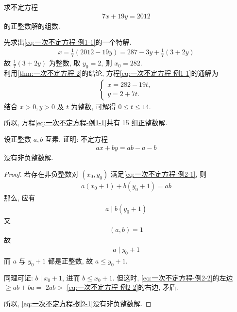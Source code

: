 \begin{example}
	求不定方程
	\begin{align}\label{eq:一次不定方程-例1-1}
		7 x+19 y=2012
	\end{align}
	的正整数解的组数.
\end{example}
\begin{solution}
	先求出\autoref{eq:一次不定方程-例1-1}的一个特解.
	\begin{align*}
		x=\frac{1}{7}(2012-19 y)=287-3 y+\frac{1}{7}(3+2 y)
	\end{align*}
	故 $\frac{1}{7}(3+2 y)$ 为整数, 取 $y_{0}=2$, 则 $x_{0}=282$.\\
	利用\autoref{thm:一次不定方程-2}的结论, 方程\autoref{eq:一次不定方程-例1-1}的通解为
	\begin{align*}
		\left\{\begin{array}{l}
			       x=282-19 t, \\
			       y=2+7 t .
		       \end{array}\right.
	\end{align*}
	结合 $x>0, y>0$ 及 $t$ 为整数, 可解得 $0 \leqslant t \leqslant 14$.

	所以, 方程\autoref{eq:一次不定方程-例1-1}共有 15 组正整数解.
\end{solution}

\begin{example}
	设正整数 $a ,  b$ 互素. 证明: 不定方程
	\begin{align}\label{eq:一次不定方程-例2-1}
		a x+b y=a b-a-b
	\end{align}
	没有非负整数解.
\end{example}
\begin{proof}
	若存在非负整数对 $\left(x_{0}, y_{0}\right)$ 满足\autoref{eq:一次不定方程-例2-1}, 则
	\begin{align}\label{eq:一次不定方程-例2-2}
		a\left(x_{0}+1\right)+b\left(y_{0}+1\right)=a b
	\end{align}
	那么, 应有
	\begin{align*}
		a \mid b\left(y_{0}+1\right)
	\end{align*}
	又
	\begin{align*}
		(a, b)=1
	\end{align*}
	故
	\begin{align*}
		a \mid y_{0}+1
	\end{align*}
	而 $a$ 与 $y_{0}+1$ 都是正整数, 故 $a \leqslant y_{0}+1$.

	同理可证: $b \mid x_{0}+1$, 进而 $b \leqslant x_{0}+1$. 但这时, \autoref{eq:一次不定方程-例2-2}的左边 $\geqslant a b+b a=$ $2 a b>$ \autoref{eq:一次不定方程-例2-2}的右边, 矛盾.

	所以, \autoref{eq:一次不定方程-例2-1}没有非负整数解.
\end{proof}

